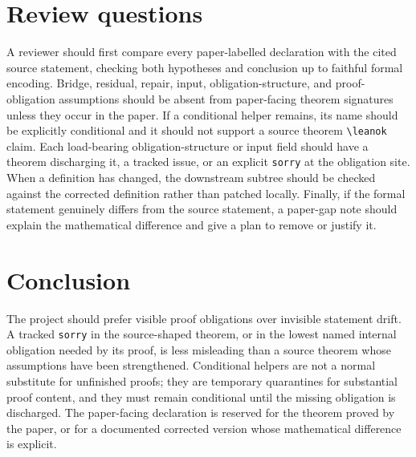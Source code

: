 \documentclass[11pt]{article}
\begin{document}
\section{Review questions}

A reviewer should first compare every paper-labelled declaration with the cited
source statement, checking both hypotheses and conclusion up to faithful formal
encoding.  Bridge, residual, repair, input, obligation-structure, and
proof-obligation assumptions should be absent from paper-facing theorem
signatures unless they occur in the paper.  If a conditional helper remains,
its name should be explicitly conditional and it should not support a source
theorem \verb|\leanok| claim.
Each load-bearing obligation-structure or input field should have a theorem
discharging it, a tracked issue, or an explicit \verb|sorry| at the obligation
site.  When a definition has changed, the downstream subtree should be checked
against the corrected definition rather than patched locally.  Finally, if the
formal statement genuinely differs from the source statement, a paper-gap note
should explain the mathematical difference and give a plan to remove or justify
it.

\section{Conclusion}

The project should prefer visible proof obligations over invisible statement
drift.  A tracked \verb|sorry| in the source-shaped theorem, or in the lowest
named internal obligation needed by its proof, is less misleading than a source
theorem whose assumptions have been strengthened.  Conditional helpers are not a
normal substitute for unfinished proofs; they are temporary quarantines for
substantial proof content, and they must remain conditional until the missing
obligation is discharged.  The paper-facing declaration is reserved for the
theorem proved by the paper, or for a documented corrected version whose
mathematical difference is explicit.
\end{document}
